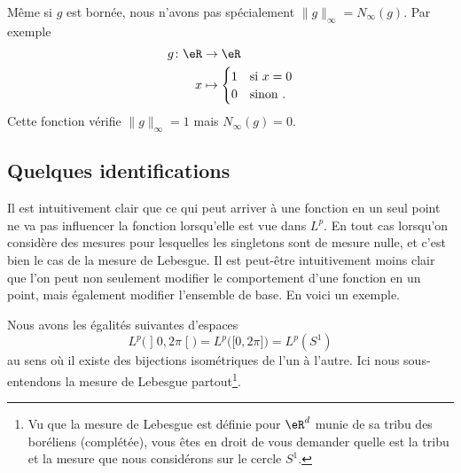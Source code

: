 \begin{example}
	Même si \( g\) est bornée, nous n'avons pas spécialement \( \| g \|_{\infty}=N_{\infty}(g)\). Par exemple
	\begin{equation}
		\begin{aligned}
			g\colon \eR & \to \eR                    \\
			x           & \mapsto \begin{cases}
				                      1 & \text{si } x=0 \\
				                      0 & \text{sinon }.
			                      \end{cases}
		\end{aligned}
	\end{equation}
	Cette fonction vérifie \( \| g \|_{\infty}=1\) mais \( N_{\infty}(g)=0\).
\end{example}

\subsection{Quelques identifications}

Il est intuitivement clair que ce qui peut arriver à une fonction en un seul point ne va pas influencer la fonction lorsqu'elle est vue dans \( L^p\). En tout cas lorsqu'on considère des mesures pour lesquelles les singletons sont de mesure nulle, et c'est bien le cas de la mesure de Lebesgue. Il est peut-être intuitivement moins clair que l'on peut non seulement modifier le comportement d'une fonction en un point, mais également modifier l'ensemble de base. En voici un exemple.

\begin{proposition}
	Nous avons les égalités suivantes d'espaces
	\begin{equation}
		L^p\big( \mathopen] 0 , 2\pi \mathclose[ \big)=L^p\big( \mathopen[ 0 , 2\pi \mathclose] \big)=L^p(S^1)
	\end{equation}
	au sens où il existe des bijections isométriques de l'un à l'autre. Ici nous sous-entendons la mesure de Lebesgue partout\footnote{Vu que la mesure de Lebesgue est définie pour \( \eR^d\) munie de sa tribu des boréliens (complétée), vous êtes en droit de vous demander quelle est la tribu et la mesure que nous considérons sur le cercle \( S^1\).}.
\end{proposition}


